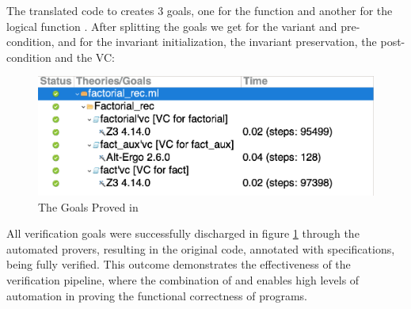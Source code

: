 The translated code to \whyml creates 3 goals, one for the function  and another for the logical function
. After splitting the goals we get for  the variant and pre-condition, and for
 the invariant initialization, the invariant preservation, the post-condition and the VC:

\begin{figure}[H]
    \centering
    \includegraphics[width=0.7\linewidth]{images/Why3Goals.png}
    \caption{The Goals Proved in \whythree}
    \label{fig:Why3Goals}
\end{figure}

All verification goals were successfully discharged in figure \ref{fig:Why3Goals} through the automated provers, resulting in the 
original \ocaml code, annotated 
with \gospel specifications, being fully verified. This outcome demonstrates the effectiveness of the verification pipeline, 
where the combination of \cameleer and \whythree enables high levels of automation in proving the functional correctness of 
\ocaml programs.